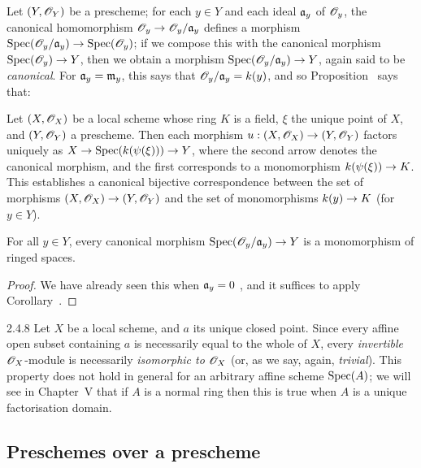 Let $(Y,\mathscr{O}_Y)$ be a prescheme;
for each $y\in Y$ and each ideal $\mathfrak{a}_y$ of $\mathscr{O}_y$, the canonical homomorphism $\OO_y\to\OO_y/\fk{a}_y$ defines a morphism $\Spec(\OO_y/\fk{a}_y)\to\Spec(\OO_y)$;
if we compose this with the canonical morphism $\Spec(\OO_y)\to Y$, then we obtain a morphism $\Spec(\OO_y/\fk{a}_y)\to Y$, again said to be \textit{canonical}.
For $\mathfrak{a}_y=\mathfrak{m}_y$, this says that $\mathscr{O}_y/\mathfrak{a}_y=k(y)$, and so Proposition~ says that:

\begin{cor}[2.4.6]
\label{1.2.4.6}
Let $(X,\mathscr{O}_X)$ be a local scheme whose ring $K$ is a field, $\xi$ the unique point of $X$, and $(Y,\mathscr{O}_Y)$ a prescheme.
Then each morphism $u:(X,\OO_X)\to(Y,\OO_Y)$ factors uniquely as $X\to\Spec(\kres(\psi(\xi)))\to Y$, where the second arrow denotes the canonical morphism, and the first corresponds to a monomorphism $\kres(\psi(\xi))\to K$.
This establishes a canonical bijective correspondence between the set of morphisms $(X,\OO_X)\to (Y,\OO_Y)$ and the set of monomorphisms $\kres(y)\to K$ (for $y\in Y$).
\end{cor}

\begin{cor}[2.4.7]
\label{1.2.4.7}
For all $y\in Y$, every canonical morphism $\Spec(\OO_y/\fk{a}_y)\to Y$ is a monomorphism of ringed spaces.
\end{cor}

\begin{proof}
\label{proof-1.2.4.7}
We have already seen this when $\mathfrak{a}_y=0$ , and it suffices to apply Corollary~.
\end{proof}

\begin{rmk}{2.4.8}
\label{1.2.4.8}
Let $X$ be a local scheme, and $a$ its unique closed point.
Since every affine open subset containing $a$ is necessarily equal to the whole of $X$, every \emph{invertible} $\mathscr{O}_X$-module  is necessarily \emph{isomorphic to $\mathscr{O}_X$} (or, as we say, again, \emph{trivial}).
This property does not hold in general for an arbitrary affine scheme ${\mathop{\mathrm{Spec}}\nolimits}(A)$;
we will see in Chapter~V that if $A$ is a normal ring then this is true when $A$ is a unique factorisation domain.
\end{rmk}

\subsection{Preschemes over a prescheme}
\label{subsection-preschemes-over-prescheme}

